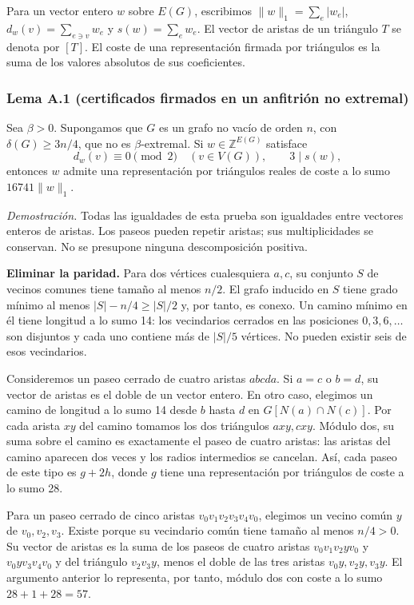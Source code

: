 \documentclass[spanish,11pt,a4paper]{article}
\begin{document}
Para un vector entero \(w\) sobre \(E(G)\), escribimos \(\|w\|_1=\sum_e|w_e|\), \(d_w(v)=\sum_{e\ni v}w_e\) y \(s(w)=\sum_e w_e\). El vector de aristas de un triángulo \(T\) se denota por \([T]\). El coste de una representación firmada por triángulos es la suma de los valores absolutos de sus coeficientes.

\subsubsection{Lema A.1 (certificados firmados en un anfitrión no extremal)}\label{lema-a.1-certificados-firmados-en-un-anfitriuxf3n-no-extremal}

Sea \(\beta>0\). Supongamos que \(G\) es un grafo no vacío de orden \(n\), con \(\delta(G)\ge3n/4\), que no es \(\beta\)-extremal. Si \(w\in\mathbb Z^{E(G)}\) satisface \[d_w(v)\equiv0\pmod2\quad(v\in V(G)),\qquad 3\mid s(w),\] entonces \(w\) admite una representación por triángulos reales de coste a lo sumo \(16741\|w\|_1\).

\emph{Demostración.} Todas las igualdades de esta prueba son igualdades entre vectores enteros de aristas. Los paseos pueden repetir aristas; sus multiplicidades se conservan. No se presupone ninguna descomposición positiva.

\textbf{Eliminar la paridad.} Para dos vértices cualesquiera \(a,c\), su conjunto \(S\) de vecinos comunes tiene tamaño al menos \(n/2\). El grafo inducido en \(S\) tiene grado mínimo al menos \(|S|-n/4\ge|S|/2\) y, por tanto, es conexo. Un camino mínimo en él tiene longitud a lo sumo 14: los vecindarios cerrados en las posiciones \(0,3,6,\ldots\) son disjuntos y cada uno contiene más de \(|S|/5\) vértices. No pueden existir seis de esos vecindarios.

Consideremos un paseo cerrado de cuatro aristas \(abcd a\). Si \(a=c\) o \(b=d\), su vector de aristas es el doble de un vector entero. En otro caso, elegimos un camino de longitud a lo sumo 14 desde \(b\) hasta \(d\) en \(G[N(a)\cap N(c)]\). Por cada arista \(xy\) del camino tomamos los dos triángulos \(axy,cxy\). Módulo dos, su suma sobre el camino es exactamente el paseo de cuatro aristas: las aristas del camino aparecen dos veces y los radios intermedios se cancelan. Así, cada paseo de este tipo es \(g+2h\), donde \(g\) tiene una representación por triángulos de coste a lo sumo 28.

Para un paseo cerrado de cinco aristas \(v_0v_1v_2v_3v_4v_0\), elegimos un vecino común \(y\) de \(v_0,v_2,v_3\). Existe porque su vecindario común tiene tamaño al menos \(n/4>0\). Su vector de aristas es la suma de los paseos de cuatro aristas \(v_0v_1v_2yv_0\) y \(v_0yv_3v_4v_0\) y del triángulo \(v_2v_3y\), menos el doble de las tres aristas \(v_0y,v_2y,v_3y\). El argumento anterior lo representa, por tanto, módulo dos con coste a lo sumo \(28+1+28=57\).
\end{document}

